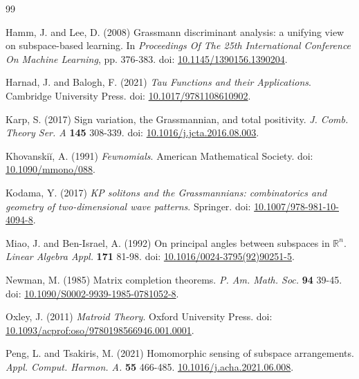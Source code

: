 \documentclass[10pt]{article}
\theoremstyle{remark}%
\theoremstyle{definition}%
\begin{document}
\begin{thebibliography}{99}
{
Hamm, J. and Lee, D. (2008) Grassmann discriminant analysis: a unifying view on subspace-based learning. In {\em Proceedings Of The 25th International Conference On Machine Learning}, pp. 376-383. doi: \href{https://doi.org/10.1145/1390156.1390204}{10.1145/1390156.1390204}.

Harnad, J. and Balogh, F. (2021) {\em Tau Functions and their Applications}. Cambridge University Press. doi: \href{https://doi.org/10.1017/9781108610902}{10.1017/9781108610902}.


Karp, S. (2017) Sign variation, the Grassmannian, and total positivity. {\em J. Comb. Theory Ser. A} \textbf{145} 308-339. doi: \href{https://doi.org/10.1016/j.jcta.2016.08.003}{10.1016/j.jcta.2016.08.003}. 

Khovanskiĭ, A. (1991) {\em Fewnomials}. American Mathematical Society. doi: \href{https://doi.org/10.1090/mmono/088}{10.1090/mmono/088}.

Kodama, Y. (2017) {\em KP solitons and the Grassmannians: combinatorics and geometry of two-dimensional wave patterns}. Springer. doi: \href{https://doi.org/10.1007/978-981-10-4094-8}{10.1007/978-981-10-4094-8}.


Miao, J. and Ben-Israel, A. (1992) On principal angles between subspaces in $\mathbb{R}^{n}$. {\em Linear Algebra Appl.} \textbf{171} 81-98. doi: \href{https://doi.org/10.1016/0024-3795(92)90251-5}{10.1016/0024-3795(92)90251-5}.

Newman, M. (1985) Matrix completion theorems. {\em P. Am. Math. Soc.} \textbf{94} 39-45. doi: \href{https://doi.org/10.1090/S0002-9939-1985-0781052-8}{10.1090/S0002-9939-1985-0781052-8}. 

Oxley, J. (2011) {\em Matroid Theory}. Oxford University Press. doi: \href{https://doi.org/10.1093/acprof:oso/9780198566946.001.0001}{10.1093/acprof:oso/9780198566946.001.0001}. 

Peng, L. and Tsakiris, M. (2021) Homomorphic sensing of subspace arrangements. {\em Appl. Comput. Harmon. A.} \textbf{55} 466-485. \href{https://doi.org/10.1016/j.acha.2021.06.008}{10.1016/j.acha.2021.06.008}. 

}
\end{thebibliography}
\end{document}
